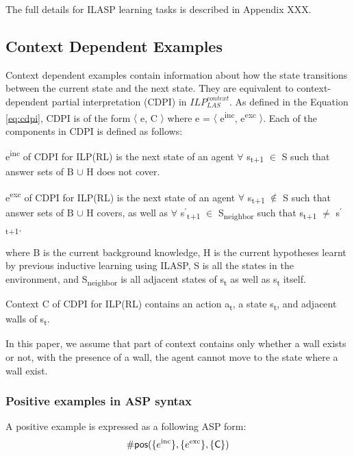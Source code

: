 The full details for ILASP learning tasks is described in Appendix XXX.

\subsection{Context Dependent Examples}
Context dependent examples contain information about how the state transitions between the current state and the next state.
They are equivalent to context-dependent partial interpretation (CDPI) in  $ILP_{LAS}^{context}$. 
As defined in the Equation \ref{eq:cdpi}, CDPI is of the form $\langle$ e, C $\rangle$ where e = $\langle$ e\textsuperscript{inc}, e\textsuperscript{exc} $\rangle$. 
Each of the components in CDPI is defined as follows:
\begin{defn}
e\textsuperscript{inc} of CDPI for ILP(RL) is the next state of an agent $\forall$ s\textsubscript{t+1} $\in$ S such that answer sets of B $\cup$ H does not cover.
\end{defn}

\begin{defn} \label{def:ILPRL_exc}
e\textsuperscript{exc} of CDPI for ILP(RL) is the next state of an agent $\forall$ s\textsubscript{t+1} $\not\in$ S such that answer sets of B $\cup$ H covers,
as well as $\forall$ s$^\prime$\textsubscript{t+1} $\in$ S\textsubscript{neighbor} such that s\textsubscript{t+1} $\neq$ s$^\prime$\textsubscript{t+1}.
\end{defn}
where B is the current background knowledge, H is the current hypotheses learnt by previous inductive learning using ILASP, S is all the states in the environment, and S\textsubscript{neighbor} is all adjacent states of s\textsubscript{t} as well as s\textsubscript{t} itself.

\begin{defn}\label{def:ILPRL_context}
Context C of CDPI for ILP(RL) contains an action a\textsubscript{t}, a state s\textsubscript{t}, and adjacent walls of s\textsubscript{t}.
\label{def:context}
\end{defn}

In this paper, we assume that part of context contains only whether a wall exists or not, with the presence of a wall, the agent cannot move to the state where a wall exist.

\subsubsection{Positive examples in ASP syntax}
\label{subsubsec:positive_examples_asp_syntax}
A positive example is expressed as a following ASP form:
\begin{equation}
\begin{split}
    \textsf{\#pos}(\{e\textsuperscript{inc}\}, \{e\textsuperscript{exc}\}, \textsf{\{C\}})
\end{split}
\end{equation}

